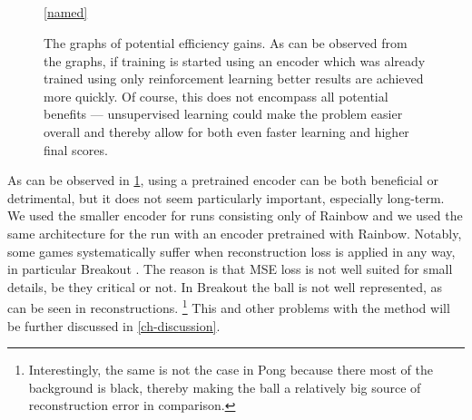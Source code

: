 \begin{figure}[!t]
  \captionsetup[subfloat]{position=top,labelformat=empty}
  \centering
    \subfloat[]{  \resizebox{0.4\textwidth}{!}{}}
    \subfloat[]{  \resizebox{0.4\textwidth}{!}{}}\\
  \vspace{-1cm}
    \subfloat[]{  \resizebox{0.4\textwidth}{!}{}}
    \subfloat[]{  \resizebox{0.4\textwidth}{!}{}}\\
  \vspace{-1cm}
    \subfloat[]{  \resizebox{0.4\textwidth}{!}{}}
    \subfloat[]{  \resizebox{0.4\textwidth}{!}{}}\\
  \vspace{-1cm}
    \subfloat[]{  \resizebox{0.4\textwidth}{!}{}}
    \\

    \ref{named}
  \caption{The graphs of potential efficiency gains. As can be observed from the graphs,
  if training is started using an encoder which was already trained using
only reinforcement learning better results are achieved more quickly. Of course, this does not
encompass all potential benefits --- unsupervised learning could make the problem easier overall
and thereby allow for both even faster learning and higher final scores.}
  \label{fig:rl-only-vs-pretrained}
\end{figure}

As can be observed in \ref{fig:rl-only-vs-pretrained}, 
using a pretrained encoder can be both beneficial
or detrimental, but it does not seem particularly important, especially long-term.
We used the smaller encoder for runs consisting only of Rainbow and we used 
the same architecture for the run with an encoder pretrained with Rainbow.
Notably, some games systematically suffer when reconstruction loss is applied in any way,
in particular Breakout . The reason is that MSE loss is not well suited for small 
details, be they critical or not. In Breakout the ball is not well represented,
as can be seen in reconstructions.
\footnote{Interestingly, the same is not the case in Pong because there most of
the background is black, thereby making the ball a relatively big source of 
reconstruction error in comparison.}
This and other problems with the method will be further discussed in 
\ref{ch-discussion}.

